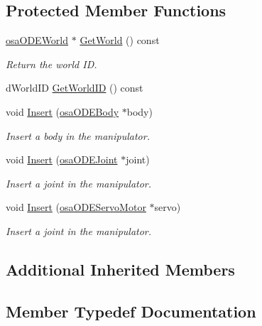 \subsection*{Protected Member Functions}
\begin{DoxyCompactItemize}
\item 
\hyperlink{classosa_o_d_e_world}{osa\+O\+D\+E\+World} $\ast$ \hyperlink{classosa_o_d_e_manipulator_a9d6017215f555ce41f107441d362faa6}{Get\+World} () const 
\begin{DoxyCompactList}\small\item\em Return the world I\+D. \end{DoxyCompactList}\item 
d\+World\+I\+D \hyperlink{classosa_o_d_e_manipulator_ab121c4ede642ec90e0522d8e7a1c693c}{Get\+World\+I\+D} () const 
\item 
void \hyperlink{classosa_o_d_e_manipulator_a659fb1e1f1fe5e8b2a70d40ce33173b9}{Insert} (\hyperlink{classosa_o_d_e_body}{osa\+O\+D\+E\+Body} $\ast$body)
\begin{DoxyCompactList}\small\item\em Insert a body in the manipulator. \end{DoxyCompactList}\item 
void \hyperlink{classosa_o_d_e_manipulator_aea69b012a10e675b2c2f614c1462edfe}{Insert} (\hyperlink{classosa_o_d_e_joint}{osa\+O\+D\+E\+Joint} $\ast$joint)
\begin{DoxyCompactList}\small\item\em Insert a joint in the manipulator. \end{DoxyCompactList}\item 
void \hyperlink{classosa_o_d_e_manipulator_a32b6281c41f447bb25256c0f271b2f15}{Insert} (\hyperlink{classosa_o_d_e_servo_motor}{osa\+O\+D\+E\+Servo\+Motor} $\ast$servo)
\begin{DoxyCompactList}\small\item\em Insert a joint in the manipulator. \end{DoxyCompactList}\end{DoxyCompactItemize}
\subsection*{Additional Inherited Members}


\subsection{Member Typedef Documentation}
\hypertarget{classosa_o_d_e_manipulator_a56c8457aa6c0240b62580dcfce383ed2}{}
